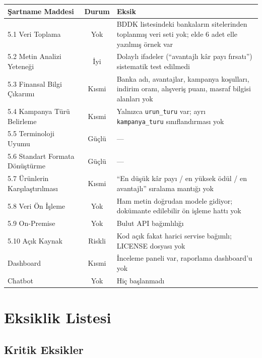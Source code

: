 \documentclass[11pt,a4paper]{article}
\begin{document}
\begin{longtable}{p{5.2cm} c p{7.4cm}}
\toprule
\textbf{Şartname Maddesi} & \textbf{Durum} & \textbf{Eksik} \\
\midrule
\endhead
5.1 Veri Toplama & \textcolor{kritik}{Yok} & BDDK listesindeki bankaların sitelerinden toplanmış veri seti yok; elde 6 adet elle yazılmış örnek var \\
5.2 Metin Analizi Yeteneği & \textcolor{tamam}{İyi} & Dolaylı ifadeler (``avantajlı kâr payı fırsatı'') sistematik test edilmedi \\
5.3 Finansal Bilgi Çıkarımı & \textcolor{onemli}{Kısmi} & Banka adı, avantajlar, kampanya koşulları, indirim oranı, alışveriş puanı, masraf bilgisi alanları yok \\
5.4 Kampanya Türü Belirleme & \textcolor{onemli}{Kısmi} & Yalnızca \texttt{urun\_turu} var; ayrı \texttt{kampanya\_turu} sınıflandırması yok \\
5.5 Terminoloji Uyumu & \textcolor{tamam}{Güçlü} & --- \\
5.6 Standart Formata Dönüştürme & \textcolor{tamam}{Güçlü} & --- \\
5.7 Ürünlerin Karşılaştırılması & \textcolor{onemli}{Kısmi} & ``En düşük kâr payı / en yüksek ödül / en avantajlı'' sıralama mantığı yok \\
5.8 Veri Ön İşleme & \textcolor{kritik}{Yok} & Ham metin doğrudan modele gidiyor; dokümante edilebilir ön işleme hattı yok \\
5.9 On-Premise & \textcolor{kritik}{Yok} & Bulut API bağımlılığı \\
5.10 Açık Kaynak & \textcolor{onemli}{Riskli} & Kod açık fakat harici servise bağımlı; LICENSE dosyası yok \\
Dashboard & \textcolor{onemli}{Kısmi} & İnceleme paneli var, raporlama dashboard'u yok \\
Chatbot & \textcolor{kritik}{Yok} & Hiç başlanmadı \\
\bottomrule
\end{longtable}

\section{Eksiklik Listesi}

\subsection{Kritik Eksikler}
\end{document}
